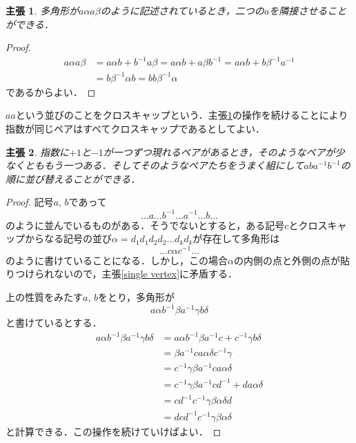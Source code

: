 \documentclass[dvipdfmx,uplatex]{jsarticle}
\newtheorem{claimindep}{主張}
\begin{document}
\begin{center}
\end{center}

\begin{claimindep}\label{crosscap}
多角形が$a\alpha a\beta$のように記述されているとき，二つの$a$を隣接させることができる．
\end{claimindep}

\begin{proof}
\begin{align*}
      a\alpha a\beta
  &= a\alpha b+b^{-1}a\beta 
  = a\alpha b+a\beta b^{-1} 
  = a\alpha b+b\beta^{-1}a^{-1} \\ 
 &= b\beta^{-1}\alpha b
  = bb\beta^{-1}\alpha 
\end{align*}
であるからよい．
\end{proof}

$aa$という並びのことをクロスキャップという．主張\ref{crosscap}の操作を続けることにより指数が同じペアはすべてクロスキャップであるとしてよい．

\begin{claimindep}\label{handle}
指数に$+1$と$-1$が一つずつ現れるペアがあるとき，そのようなペアが少なくとももう一つある．そしてそのようなペアたちをうまく組にして$aba^{-1}b^{-1}$の順に並び替えることができる．
\end{claimindep}

\begin{proof}
記号$a$, $b$であって
\[ \dots a \dots b^{-1} \dots a^{-1} \dots b \dots\]
のように並んでいるものがある．そうでないとすると，ある記号$c$とクロスキャップからなる記号の並び$\alpha=d_1d_1d_2d_2\dots d_kd_k$が存在して多角形は
\[ \dots c  \alpha c^{-1} \dots \]
のように書けていることになる．しかし，この場合$\alpha$の内側の点と外側の点が貼りつけられないので，主張\ref{single vertex}に矛盾する．

上の性質をみたす$a$, $b$をとり，多角形が
\[ a\alpha b^{-1} \beta a^{-1} \gamma b \delta \]
と書けているとする．
\begin{align*}
      a\alpha b^{-1} \beta a^{-1} \gamma b \delta
  &= a\alpha b^{-1} \beta a^{-1} c+ c^{-1} \gamma b \delta \\
  &= \beta a^{-1}ca\alpha \delta c^{-1}\gamma \\
  &= c^{-1}\gamma \beta a^{-1}ca\alpha \delta \\
  &= c^{-1}\gamma \beta a^{-1}cd^{-1}+da\alpha \delta \\
  &= cd^{-1}c^{-1}\gamma \beta \alpha \delta d \\
  &= dcd^{-1}c^{-1}\gamma \beta \alpha \delta
\end{align*}
と計算できる．この操作を続けていけばよい．
\end{proof}
\end{document}
